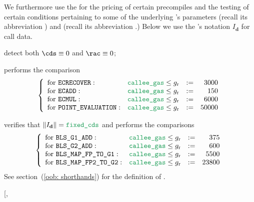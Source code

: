 We furthermore use the \oobMod{} for the pricing of certain precompiles and the testing of certain conditions pertaining to some of the underlying 's parameters
\CDS{} (recall its abbreviation \cds{}) and
\RAC{} (recall its abbreviation \rac{}.)
\saNote{} Below we use the \cite{EYP-London}'s notation $I_\textbf{d}$ for call data.
\begin{description}
	\item[\underline{\instEcrecover{},
		\instShaTwo{},
		\instRipemd{},
		\instIdentity{},
		\instEcadd{},
		\instEcmul{},
		\instEcpairing{},
		\instPointEvaluation{},
		\instBlsGOneAdd{},
		\instBlsGTwoAdd{},
		\instBlsMapFpToGOne{},
		\instBlsMapFpTwoToGTwo{}:}]
		detect both $\cds \equiv 0$ and $\rac \equiv 0$; 
	\item[\underline{\instEcrecover{},
		\instEcadd{},
		\instEcmul{} and
		\instPointEvaluation{} pricing:}]
		performs the comparison
		\[
			\left\{ \begin{array}{llcrcl}
				\text{for }\instEcrecover{}       : & \locCalleeGas \leq g_\text{r} & := &  3000 \\
				\text{for }\instEcadd{}           : & \locCalleeGas \leq g_\text{r} & := &   150 \\
				\text{for }\instEcmul{}           : & \locCalleeGas \leq g_\text{r} & := &  6000 \\
				\text{for }\instPointEvaluation{} : & \locCalleeGas \leq g_\text{r} & := & 50000 \\
			\end{array} \right.
		\]
	\item[\underline{\instBlsGOneAdd{},
		\instBlsGTwoAdd{},
		\instBlsMapFpToGOne{}, and
		\instBlsMapFpTwoToGTwo{}:}]
		verifies that $\| I_\textbf{d} \| = \locFixedCds$ and performs the comparisons
		\[
			\left\{ \begin{array}{llcrcl}
				\text{for }\instBlsGOneAdd{}        : & \locCalleeGas \leq g_\text{r} & := &   375 \\
				\text{for }\instBlsGTwoAdd{}        : & \locCalleeGas \leq g_\text{r} & := &   600 \\
				\text{for }\instBlsMapFpToGOne{}    : & \locCalleeGas \leq g_\text{r} & := &  5500 \\
				\text{for }\instBlsMapFpTwoToGTwo{} : & \locCalleeGas \leq g_\text{r} & := & 23800 \\
			\end{array} \right.
		\]
		See section~(\ref{oob: shorthands}) for the definition of \locFixedCds{}.	
	\item[\underline{\instShaTwo{},
}
\end{description}
